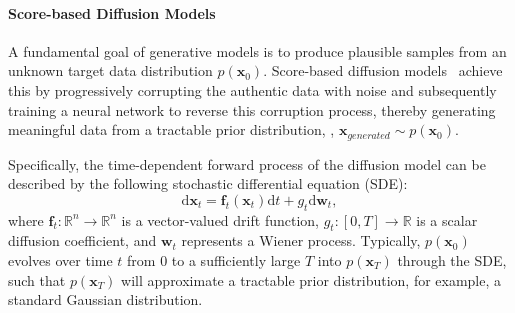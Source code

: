 \paragraph{Score-based Diffusion Models}
A fundamental goal of generative models is to produce plausible samples from an unknown target data distribution $p(\mathbf{x}_0)$.
%
Score-based diffusion models~\cite{NCSN+NeurIPS2019, Score-SDE+ICLR2021} achieve this by progressively corrupting the authentic data with noise and subsequently training a neural network to reverse this corruption process, thereby generating meaningful data from a tractable prior distribution, \ie,  $\mathbf{x}_{generated}\sim p(\mathbf{x}_0)$.

Specifically, the time-dependent forward process of the diffusion model can be described by the following stochastic differential equation (SDE):
\begin{equation}
\label{eq:forward-SDE}
\mathrm{d}\mathbf{x}_t=\mathbf{f}_t\left(\mathbf{x}_t\right)\mathrm{d}t+g_t\mathrm{d}\mathbf{w}_t,
\end{equation}
where $\mathbf{f}_t: \mathbb{R}^n \to \mathbb{R}^n$ is a vector-valued drift function, $g_t: [0,T]\to \mathbb{R} $ is a scalar diffusion coefficient, and $\mathbf{w}_t$ represents a Wiener process. 
Typically, $p(\mathbf{x}_0)$ evolves over time $t$ from $0$ to a sufficiently large $T$ into $p(\mathbf{x}_T )$ through the SDE, such that $p(\mathbf{x}_T )$ will approximate a tractable prior distribution, for example, a standard Gaussian distribution. 

